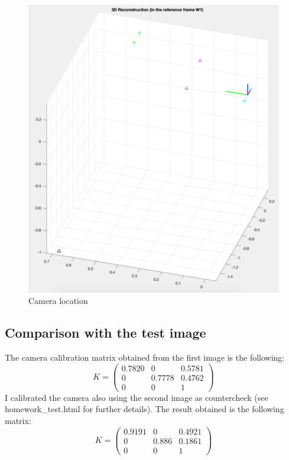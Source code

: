 \documentclass{article}
\begin{document}
\begin{figure}[hbt!]
\centering
\includegraphics[scale=0.45]{images/cameralocation.png}
\caption{Camera location}
\label{fig:cameralocation}
\end{figure}

\newpage
\subsection{Comparison with the test image}
The camera calibration matrix obtained from the first image is the following:
$$ K = \begin{pmatrix}
0.7820 & 0 & 0.5781 \\
0 & 0.7778 & 0.4762 \\
0 & 0 & 1
\end{pmatrix} $$
I calibrated the camera also using the second image as countercheck (see homework\_test.html for further details). The result obtained is the following matrix:
$$ K = \begin{pmatrix}
0.9191 & 0 & 0.4921 \\
0 & 0.886 & 0.1861 \\
0 & 0 & 1
\end{pmatrix} $$
\end{document}
